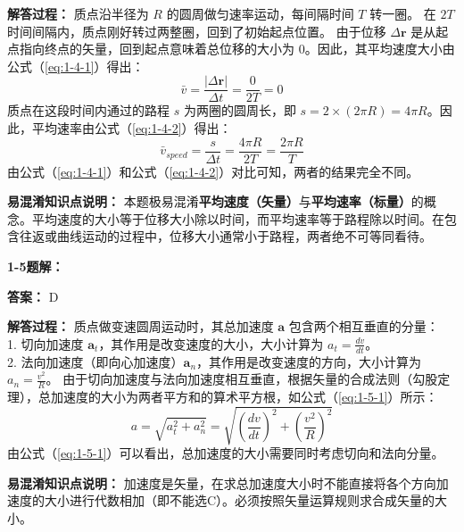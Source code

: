 \textbf{解答过程：}
质点沿半径为 $R$ 的圆周做匀速率运动，每间隔时间 $T$ 转一圈。
在 $2T$ 时间间隔内，质点刚好转过两整圈，回到了初始起点位置。
由于位移 $\Delta \mathbf{r}$ 是从起点指向终点的矢量，回到起点意味着总位移的大小为 $0$。因此，其平均速度大小由公式（\ref{eq:1-4-1}）得出：
\begin{equation}\label{eq:1-4-1}
	\bar{v} = \frac{|\Delta \mathbf{r}|}{\Delta t} = \frac{0}{2T} = 0
\end{equation}
质点在这段时间内通过的路程 $s$ 为两圈的圆周长，即 $s = 2 \times (2\pi R) = 4\pi R$。因此，平均速率由公式（\ref{eq:1-4-2}）得出：
\begin{equation}\label{eq:1-4-2}
	\bar{v}_{speed} = \frac{s}{\Delta t} = \frac{4\pi R}{2T} = \frac{2\pi R}{T}
\end{equation}
由公式（\ref{eq:1-4-1}）和公式（\ref{eq:1-4-2}）对比可知，两者的结果完全不同。

\textbf{易混淆知识点说明：}
本题极易混淆\textbf{平均速度（矢量）}与\textbf{平均速率（标量）}的概念。平均速度的大小等于位移大小除以时间，而平均速率等于路程除以时间。在包含往返或曲线运动的过程中，位移大小通常小于路程，两者绝不可等同看待。

\vspace{2em}

\textbf{1-5题解：}
\setcounter{equation}{0}
\renewcommand{\theHequation}{1-5.\arabic{equation}}

\textbf{答案：} D

\textbf{解答过程：}
质点做变速圆周运动时，其总加速度 $\mathbf{a}$ 包含两个相互垂直的分量：\\
1. 切向加速度 $\mathbf{a}_t$，其作用是改变速度的大小，大小计算为 $a_t = \frac{dv}{dt}$。\\
2. 法向加速度（即向心加速度）$\mathbf{a}_n$，其作用是改变速度的方向，大小计算为 $a_n = \frac{v^2}{R}$。
由于切向加速度与法向加速度相互垂直，根据矢量的合成法则（勾股定理），总加速度的大小为两者平方和的算术平方根，如公式（\ref{eq:1-5-1}）所示：
\begin{equation}\label{eq:1-5-1}
	a = \sqrt{a_t^2 + a_n^2} = \sqrt{\left(\frac{dv}{dt}\right)^2 + \left(\frac{v^2}{R}\right)^2}
\end{equation}
由公式（\ref{eq:1-5-1}）可以看出，总加速度的大小需要同时考虑切向和法向分量。

\textbf{易混淆知识点说明：}
加速度是矢量，在求总加速度大小时不能直接将各个方向加速度的大小进行代数相加（即不能选C）。必须按照矢量运算规则求合成矢量的大小。

\vspace{2em}


